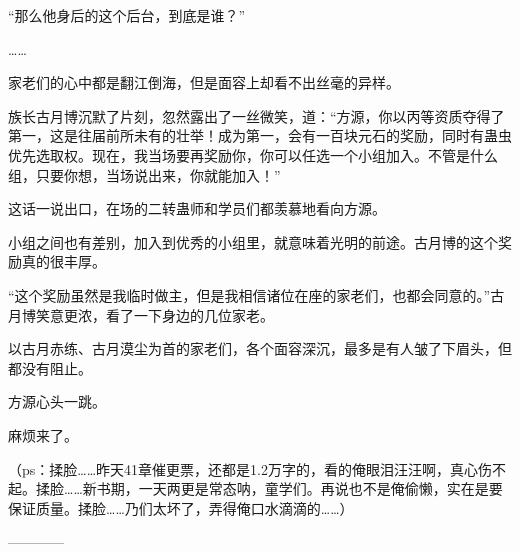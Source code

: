 \begin{this_body}
“那么他身后的这个后台，到底是谁？”

……

家老们的心中都是翻江倒海，但是面容上却看不出丝毫的异样。

族长古月博沉默了片刻，忽然露出了一丝微笑，道：“方源，你以丙等资质夺得了第一，这是往届前所未有的壮举！成为第一，会有一百块元石的奖励，同时有蛊虫优先选取权。现在，我当场要再奖励你，你可以任选一个小组加入。不管是什么组，只要你想，当场说出来，你就能加入！”

这话一说出口，在场的二转蛊师和学员们都羡慕地看向方源。

小组之间也有差别，加入到优秀的小组里，就意味着光明的前途。古月博的这个奖励真的很丰厚。

“这个奖励虽然是我临时做主，但是我相信诸位在座的家老们，也都会同意的。”古月博笑意更浓，看了一下身边的几位家老。

以古月赤练、古月漠尘为首的家老们，各个面容深沉，最多是有人皱了下眉头，但都没有阻止。

方源心头一跳。

麻烦来了。

（ps：揉脸……昨天41章催更票，还都是1.2万字的，看的俺眼泪汪汪啊，真心伤不起。揉脸……新书期，一天两更是常态呐，童学们。再说也不是俺偷懒，实在是要保证质量。揉脸……乃们太坏了，弄得俺口水滴滴的……）

------------

\end{this_body}

